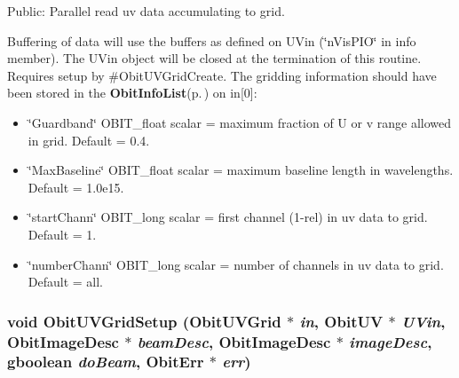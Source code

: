 Public: Parallel read uv data accumulating to grid. 

Buffering of data will use the buffers as defined on UVin (\char`\"{}n\-Vis\-PIO\char`\"{} in info member). The UVin object will be closed at the termination of this routine. Requires setup by \#Obit\-UVGrid\-Create. The gridding information should have been stored in the {\bf Obit\-Info\-List}{\rm (p.\,\pageref{structObitInfoList})} on in[0]: \begin{itemize}
\item \char`\"{}Guardband\char`\"{} OBIT\_\-float scalar = maximum fraction of U or v range allowed in grid. Default = 0.4. \item \char`\"{}Max\-Baseline\char`\"{} OBIT\_\-float scalar = maximum baseline length in wavelengths. Default = 1.0e15. \item \char`\"{}start\-Chann\char`\"{} OBIT\_\-long scalar = first channel (1-rel) in uv data to grid. Default = 1. \item \char`\"{}number\-Chann\char`\"{} OBIT\_\-long scalar = number of channels in uv data to grid. Default = all. 
\end{itemize}
\subsubsection{\setlength{\rightskip}{0pt plus 5cm}void Obit\-UVGrid\-Setup ({\bf Obit\-UVGrid} $\ast$ {\em in}, {\bf Obit\-UV} $\ast$ {\em UVin}, {\bf Obit\-Image\-Desc} $\ast$ {\em beam\-Desc}, {\bf Obit\-Image\-Desc} $\ast$ {\em image\-Desc}, gboolean {\em do\-Beam}, {\bf Obit\-Err} $\ast$ {\em err})}\label{ObitUVGrid_8c_a18}


